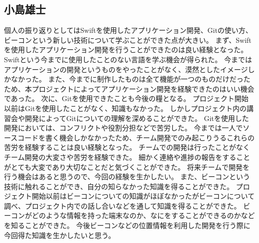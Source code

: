 \documentclass[openany,11pt,papersize]{jsbook}
\begin{document}
\subsection{小島雄士}
個人の振り返りとしてはSwiftを使用したアプリケーション開発、Gitの使い方、ビーコンという新しい技術について学ぶことができた点が大きい。
まず、Swiftを使用したアプリケーション開発を行うことができたのは良い経験となった。
Swiftという今までに使用したことのない言語を学ぶ機会が得られた。
今まではアプリケーションの開発というものをやったことがなく、漠然としたイメージしかなかった。
また、今までに制作したものは全て機能が一つのものだけだったため、本プロジェクトによってアプリケーション開発を経験できたのはいい機会であった。
次に、Gitを使用できたことも今後の糧となる。
プロジェクト開始以前はGitを使用したことがなく、知識もなかった。
しかしプロジェクト内の講習会や開発によってGitについての理解を深めることができた。
Gitを使用した開発においては、コンフリクトや役割分担などで苦労した。
今までは一人でソースコードを書く機会しかなかったため、チーム開発でのみ起こりうるこれらの苦労を経験することは良い経験となった。
チームでの開発は行ったことがなくチーム開発の大変さや苦労を経験できた。
細かく連絡や進捗の報告をすることがとても大変であり大切なことだと気づくことができた。
将来チームで開発を行う機会はあると思うので、今回の経験を生かしたい。
また、ビーコンという技術に触れることができ、自分の知らなかった知識を得ることができた。
プロジェクト開始以前はビーコンについての知識がほぼなかったがビーコンについて調べ、プロジェクト内での話し合いなどを通して知識を得ることができた。
ビーコンがどのような情報を持った端末なのか、なにをすることができるのかなどを知ることができた。
今後ビーコンなどの位置情報を利用した開発を行う際に今回得た知識を生かしたいと思う。
\end{document}
